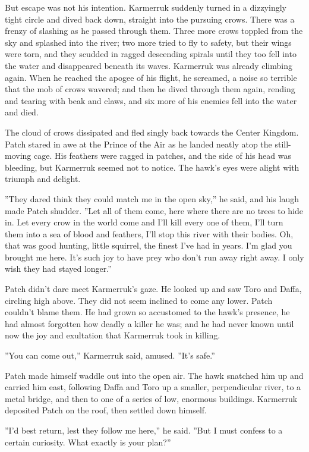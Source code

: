 \documentclass[12pt]{book}
\begin{document}
 But escape was not his intention. Karmerruk suddenly turned in a dizzyingly tight circle and dived back down, straight into the pursuing crows. There was a frenzy of slashing as he passed through them. Three more crows toppled from the sky and splashed into the river; two more tried to fly to safety, but their wings were torn, and they scudded in ragged descending spirals until they too fell into the water and disappeared beneath its waves. Karmerruk was already climbing again. When he reached the apogee of his flight, he screamed, a noise so terrible that the mob of crows wavered; and then he dived through them again, rending and tearing with beak and claws, and six more of his enemies fell into the water and died. \par
The cloud of crows dissipated and fled singly back towards the Center Kingdom. Patch stared in awe at the Prince of the Air as he landed neatly atop the still-moving cage. His feathers were ragged in patches, and the side of his head was bleeding, but Karmerruk seemed not to notice. The hawk's eyes were alight with triumph and delight.\par
 ''They dared think they could match me in the open sky,'' he said, and his laugh made Patch shudder. ''Let all of them come, here where there are no trees to hide in. Let every crow in the world come and I'll kill every one of them, I'll turn them into a sea of blood and feathers, I'll stop this river with their bodies. Oh, that was good hunting, little squirrel, the finest I've had in years. I'm glad you brought me here. It's such joy to have prey who don't run away right away. I only wish they had stayed longer.''\par
 Patch didn't dare meet Karmerruk's gaze. He looked up and saw Toro and Daffa, circling high above. They did not seem inclined to come any lower. Patch couldn't blame them. He had grown so accustomed to the hawk's presence, he had almost forgotten how deadly a killer he was; and he had never known until now the joy and exultation that Karmerruk took in killing.\par
 ''You can come out,'' Karmerruk said, amused. ''It's safe.''\par
 Patch made himself waddle out into the open air. The hawk snatched him up and carried him east, following Daffa and Toro up a smaller, perpendicular river, to a metal bridge, and then to one of a series of low, enormous buildings. Karmerruk deposited Patch on the roof, then settled down himself.\par
 ''I'd best return, lest they follow me here,'' he said. ''But I must confess to a certain curiosity. What exactly is your plan?''\par
\end{document}
